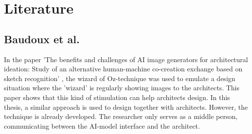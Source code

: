 \chapter{Literature}

\section{Baudoux et al.} 

In the paper 'The benefits and challenges of AI image generators for architectural ideation: Study of an alternative human-machine co-creation exchange based on sketch recognition' \cite{baudoux_benefits_nodate}, the wizard of Oz-technique was used to emulate a design situation where the 'wizard' is regularly showing images to the architects. This paper shows that this kind of stimulation can help architects design. In this thesis, a similar approach is used to design together with architects. However, the technique is already developed. The researcher only serves as a middle person, communicating between the AI-model interface and the architect.